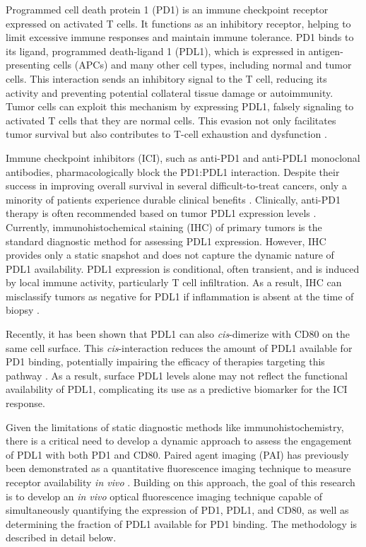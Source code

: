 Programmed cell death protein 1 (PD1) is an immune checkpoint receptor expressed on activated T cells. 
It functions as an inhibitory receptor, helping to limit excessive immune responses and maintain
immune tolerance. PD1 binds to its ligand, programmed death-ligand 1 (PDL1), which is expressed in antigen-presenting cells (APCs) and many other cell types, including normal and tumor cells. This interaction sends an inhibitory signal to the T cell, reducing its activity and preventing potential collateral tissue damage or autoimmunity. Tumor cells can exploit this mechanism by expressing PDL1, falsely signaling to activated T cells that they are normal cells. This evasion not only facilitates tumor survival but also contributes to T-cell exhaustion and dysfunction
\cite{dong2002tumor, freeman2000engagement, liu2024pdl1cis, topalian2015immune}. 

Immune checkpoint inhibitors (ICI), such as anti-PD1 and anti-PDL1 monoclonal antibodies, pharmacologically block the PD1:PDL1 interaction. Despite their success in improving overall survival in several difficult-to-treat cancers, only a minority of patients experience durable clinical benefits
\cite{bruni2020immunoscore, haslam2020estimation}. Clinically, anti-PD1 therapy is often recommended based on tumor PDL1 expression levels \cite{galon2019approaches}. Currently, immunohistochemical staining (IHC) of primary tumors is the standard diagnostic method for assessing PDL1 expression. However, IHC provides only a static snapshot and does not capture the dynamic nature of PDL1 availability. PDL1 expression is conditional, often transient, and is induced by local immune activity, particularly T cell infiltration. As a result, IHC can misclassify tumors as negative for PDL1 if inflammation is absent at the time of biopsy \cite{ribas2016pdl1}.

Recently,  it has been shown that PDL1 can also \textit{cis}-dimerize with CD80 on the same cell surface. 
This \textit{cis}-interaction reduces the amount of PDL1 available for PD1 binding, potentially impairing the efficacy of therapies targeting this pathway \cite{chaudhri2018pdcd80, liu2024pdl1cis, sugiura2019restriction}. As a result, surface PDL1 levels alone may not reflect the functional availability of PDL1, complicating its use as a predictive biomarker for the ICI response. 

Given the limitations of static diagnostic methods like immunohistochemistry, there is a critical need to develop a dynamic approach to assess the engagement of PDL1 with both PD1 and CD80. Paired agent imaging (PAI) has previously been demonstrated as a quantitative fluorescence imaging technique to measure receptor availability \textit{in vivo} \cite{tichauer2015review}. Building on this approach, the goal of this research is to develop an \textit{in vivo} optical fluorescence imaging technique capable of simultaneously quantifying the expression of PD1, PDL1, and CD80, as well as determining the fraction of PDL1 available for PD1 binding. The methodology is described in detail below.